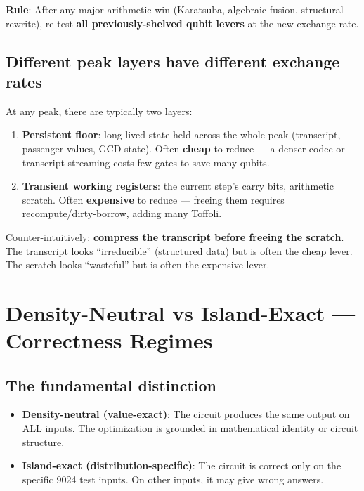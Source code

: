 \documentclass[11pt,a4paper]{article}
\begin{document}
\textbf{Rule}: After any major arithmetic win (Karatsuba, algebraic fusion, structural rewrite),
re-test \textbf{all previously-shelved qubit levers} at the new exchange rate.

\subsection{Different peak layers have different exchange rates}

At any peak, there are typically two layers:

\begin{enumerate}
  \item \textbf{Persistent floor}: long-lived state held across the whole peak (transcript,
    passenger values, GCD state). Often \textbf{cheap} to reduce --- a denser codec or transcript
    streaming costs few gates to save many qubits.
  \item \textbf{Transient working registers}: the current step's carry bits, arithmetic scratch.
    Often \textbf{expensive} to reduce --- freeing them requires recompute/dirty-borrow, adding
    many Toffoli.
\end{enumerate}

Counter-intuitively: \textbf{compress the transcript before freeing the scratch}. The transcript
looks ``irreducible'' (structured data) but is often the cheap lever. The scratch looks
``wasteful'' but is often the expensive lever.

\section{Density-Neutral vs Island-Exact --- Correctness Regimes}
\label{sec:density}

\subsection{The fundamental distinction}

\begin{itemize}
  \item \textbf{Density-neutral (value-exact)}: The circuit produces the same output on ALL
    inputs. The optimization is grounded in mathematical identity or circuit structure.
  \item \textbf{Island-exact (distribution-specific)}: The circuit is correct only on the
    specific 9024 test inputs. On other inputs, it may give wrong answers.
\end{itemize}
\end{document}
